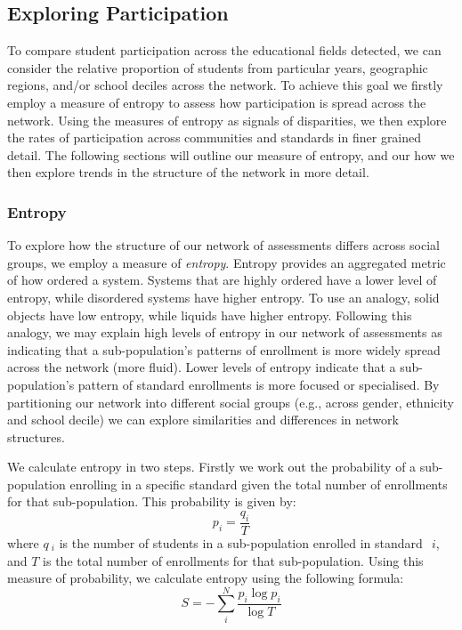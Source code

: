 \subsection{Exploring Participation}
To compare student participation across the educational fields detected, we can consider the relative proportion of students from particular years, geographic regions, and/or school deciles across the network.  To achieve this goal we firstly employ a measure of entropy to assess how participation is spread across the network. Using the measures of entropy as signals of disparities, we then explore the rates of participation across communities and standards in finer grained detail. The following sections will outline our measure of entropy, and our how we then explore trends in the structure of the network in more detail. 

\subsubsection{Entropy}
To explore how the structure of our network of assessments differs across social groups, we employ a measure of \textit{entropy}. Entropy provides an aggregated metric of how ordered a system. Systems that are highly ordered have a lower level of entropy, while disordered systems have higher entropy. To use an analogy, solid objects have low entropy, while liquids have higher entropy. Following this analogy, we may explain high levels of entropy in our network of assessments as indicating that a sub-population's patterns of enrollment is more widely spread across the network (more fluid). Lower levels of entropy indicate that a sub-population's pattern of standard enrollments is more focused or specialised. By partitioning our network into different social groups (e.g., across gender, ethnicity and school decile) we can explore similarities and differences in network structures. 

We calculate entropy in two steps. Firstly we work out the probability of a sub-population enrolling in a specific standard given the total number of enrollments for that sub-population. This probability is given by:
$$p_i = \frac{q_i}{T}$$
where $q~_i$ is the number of students in a sub-population enrolled in standard~$~i$, and $T$ is the total number of enrollments for that sub-population. Using this measure of probability, we calculate entropy using the following formula: 
$$S = -\sum_{i}^{N}{
\frac{p_i\log{p_i}}{\log{T}}
}$$


